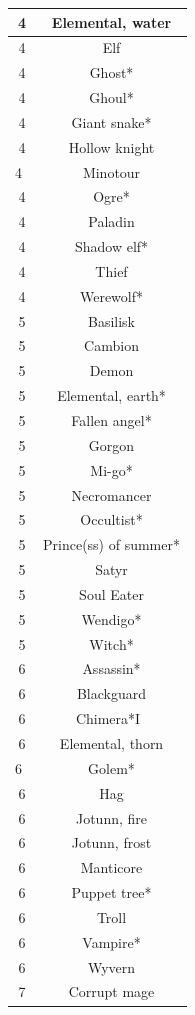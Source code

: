 \begin{longtable}{|c|c|}
4  & Elemental, water \\ \hline
4  & Elf \\ \hline
4  & Ghost* \\ \hline
4  & Ghoul* \\ \hline
4  & Giant snake* \\ \hline
4  & Hollow knight \\ \hline
4  & Minotour \\ \hline
4  & Ogre* \\ \hline
4  & Paladin \\ \hline
4  & Shadow elf* \\ \hline
4  & Thief \\ \hline
4  & Werewolf* \\ \hline
5  & Basilisk \\ \hline
5  & Cambion \\ \hline
5  & Demon \\ \hline
5  & Elemental, earth* \\ \hline
5  & Fallen angel* \\ \hline
5  & Gorgon \\ \hline
5  & Mi-go* \\ \hline
5  & Necromancer \\ \hline
5  & Occultist* \\ \hline
5  & Prince(ss) of summer* \\ \hline
5  & Satyr \\ \hline
5  & Soul Eater \\ \hline
5  & Wendigo* \\ \hline
5  & Witch* \\ \hline
6  & Assassin* \\ \hline
6  & Blackguard \\ \hline
6  & Chimera*I  \\ \hline
6  & Elemental, thorn \\ \hline
6  & Golem* \\ \hline
6  & Hag \\ \hline
6  & Jotunn, fire \\ \hline
6  & Jotunn, frost \\ \hline
6  & Manticore \\ \hline
6  & Puppet tree* \\ \hline
6  & Troll \\ \hline
6  & Vampire* \\ \hline
6  & Wyvern \\ \hline
7  & Corrupt mage \\ \hline

\end{longtable}
